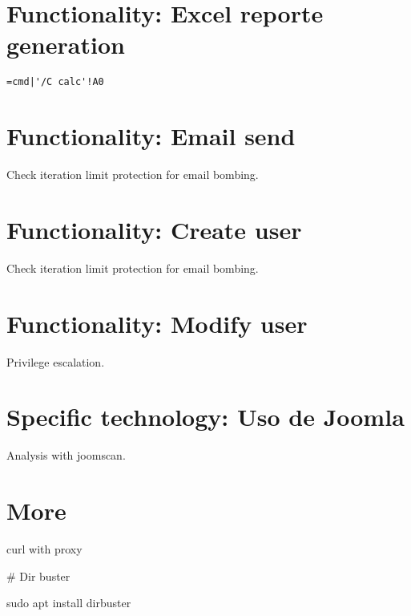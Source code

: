 \section{Functionality: Excel reporte generation}

\begin{lstlisting}[numbers=none]
	=cmd|'/C calc'!A0
\end{lstlisting}

\section{Functionality: Email send}

Check iteration limit protection for email bombing.

\section{Functionality: Create user}

Check iteration limit protection for email bombing.

\section{Functionality: Modify user}

Privilege escalation.

\section{Specific technology: Uso de Joomla}

Analysis with joomscan.

\section{More}

curl with proxy


# Dir buster

sudo apt install dirbuster


